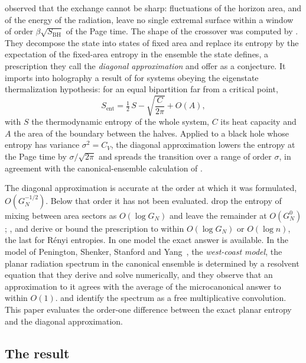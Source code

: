 \documentclass[11pt,letterpaper]{article}
\theoremstyle{plain}
\theoremstyle{definition}
\theoremstyle{remark}
\begin{document}
\citet{penington2020} observed that the exchange cannot be sharp: fluctuations of the horizon area, and of the energy of the radiation, leave no single extremal surface within a window of order $\beta\sqrt{S_{\mathrm{BH}}}$ of the Page time. The shape of the crossover was computed by \citet{marolfwangwang2020}. They decompose the state into states of fixed area and replace its entropy by the expectation of the fixed-area entropy in the ensemble the state defines, a prescription they call the \emph{diagonal approximation} and offer as a conjecture. It imports into holography a result of \citet{murthysrednicki2019} for systems obeying the eigenstate thermalization hypothesis: for an equal bipartition far from a critical point,
\begin{equation}
\label{eq01:murthy_srednicki}
S_{\mathrm{ent}} = \tfrac12\, S - \sqrt{\frac{C}{2\pi}} + O(A),
\end{equation}
with $S$ the thermodynamic entropy of the whole system, $C$ its heat capacity and $A$ the area of the boundary between the halves. Applied to a black hole whose entropy has variance $\sigma^2 = C_V$, the diagonal approximation lowers the entropy at the Page time by $\sigma/\sqrt{2\pi}$ and spreads the transition over a range of order $\sigma$, in agreement with the canonical-ensemble calculation of \citet{pssyetal2022}.

The diagonal approximation is accurate at the order at which it was formulated, $O(G_N^{-1/2})$. Below that order it has not been evaluated. \citet{marolfwangwang2020} drop the entropy of mixing between area sectors as $O(\log G_N)$ and leave the remainder at $O(G_N^0)$; \citet{akerspenington2021}, \citet{chengetal2024} and \citet{peningtonrath2025} derive or bound the prescription to within $O(\log G_N)$ or $O(\log n)$, the last for R\'enyi entropies. In one model the exact answer is available. In the model of Penington, Shenker, Stanford and Yang~\citep{pssyetal2022}, the \emph{west-coast model}, the planar radiation spectrum in the canonical ensemble is determined by a resolvent equation that they derive and solve numerically, and they observe that an approximation to it agrees with the average of the microcanonical answer to within $O(1)$. \citet{wang2023} and \citet{chengetal2024} identify the spectrum as a free multiplicative convolution. This paper evaluates the order-one difference between the exact planar entropy and the diagonal approximation.

\subsection{The result}
\label{subsec01:novel_results}
\end{document}
